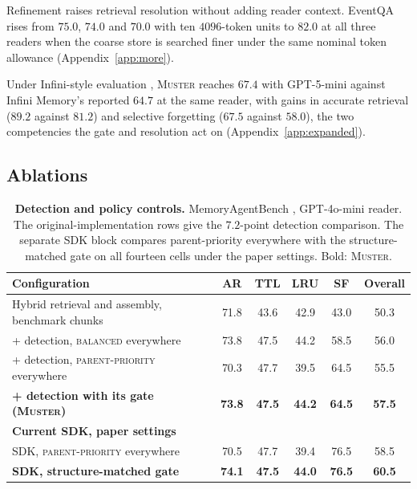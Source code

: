 \documentclass{article}
\newcommand{\ours}{\rowcolor{oursbg}}
\newcommand{\tabfont}{\fontsize{7.5}{8.5}\selectfont\renewcommand{\arraystretch}{1.0}}
\newcommand{\sys}{\textsc{Muster}}
\newcommand{\balanced}{\textsc{balanced}}
\newcommand{\parprio}{\textsc{parent-priority}}
\begin{document}
Refinement raises retrieval resolution without adding reader context. EventQA rises from $75.0$, $74.0$ and $70.0$ with ten $4096$-token units to $82.0$ at all three readers when the coarse store is searched finer under the same nominal token allowance (Appendix~\ref{app:more}).

Under Infini-style evaluation \cite{infini}, \sys{} reaches $67.4$ with GPT-5-mini against Infini Memory's reported $64.7$ at the same reader, with gains in accurate retrieval ($89.2$ against $81.2$) and selective forgetting ($67.5$ against $58.0$), the two competencies the gate and resolution act on (Appendix~\ref{app:expanded}).

\subsection{Ablations}\label{sec:ablations}

\begin{table}[t]
\centering\tabfont
\caption{\textbf{Detection and policy controls.} MemoryAgentBench \cite{mab}, GPT-4o-mini \cite{gpt4omini} reader. The original-implementation rows give the $7.2$-point detection comparison. The separate SDK block compares parent-priority everywhere with the structure-matched gate on all fourteen cells under the paper settings. Bold: \sys{}.}
\label{tab:gate}
\setlength{\tabcolsep}{3pt}\setlength{\aboverulesep}{0pt}\setlength{\belowrulesep}{0pt}\setlength{\extrarowheight}{0.8pt}
\begin{tabular}{l*{5}{c}}
\toprule
Configuration & AR & TTL & LRU & SF & Overall \\
\midrule
Hybrid retrieval and assembly, benchmark chunks & 71.8 & 43.6 & 42.9 & 43.0 & 50.3 \\
\midrule
+ detection, \balanced{} everywhere & 73.8 & 47.5 & 44.2 & 58.5 & 56.0 \\
+ detection, \parprio{} everywhere & 70.3 & 47.7 & 39.5 & 64.5 & 55.5 \\
\midrule
\ours \textbf{+ detection with its gate (\sys{})} & \textbf{73.8} & \textbf{47.5} & \textbf{44.2} & \textbf{64.5} & \textbf{57.5} \\
\midrule[\heavyrulewidth]
\multicolumn{6}{l}{\textbf{Current SDK, paper settings}}\\
SDK, \parprio{} everywhere & 70.5 & 47.7 & 39.4 & 76.5 & 58.5 \\
\ours \textbf{SDK, structure-matched gate} & \textbf{74.1} & \textbf{47.5} & \textbf{44.0} & \textbf{76.5} & \textbf{60.5} \\
\bottomrule
\end{tabular}
\end{table}
\end{document}
